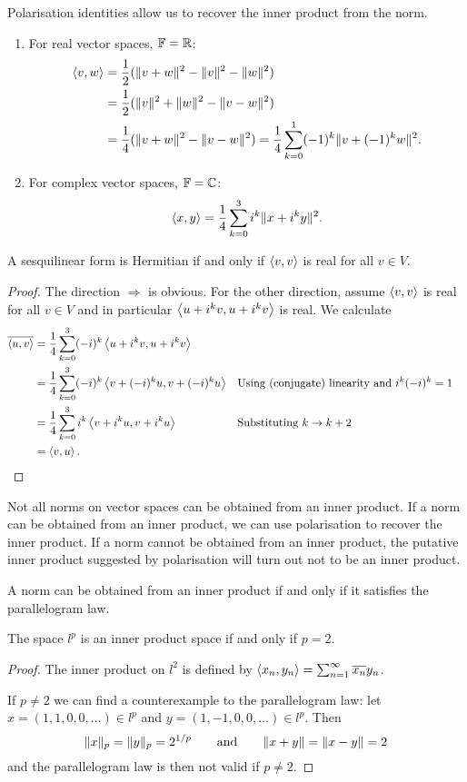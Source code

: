 \begin{theorem}
Polarisation identities allow us to recover the inner product from the norm.
\begin{enumerate}
\item For real vector spaces, $\mathbb{F} = \mathbb{R}$:
\begin{align*}
\left\langle v,w \right\rangle &= \frac{1}{2}(\lVert v+w\rVert^2 - \lVert v\rVert^2-\lVert w\rVert^2) \\
&= \frac{1}{2}(\lVert v\rVert^2 + \lVert w\rVert^2-\lVert v-w\rVert^2) \\
&= \frac{1}{4}(\lVert v+w\rVert^2 - \lVert v-w\rVert^2) = \frac{1}{4}\sum_{k=0}^1 (-1)^k\lVert v+(-1)^k w\rVert^2.
\end{align*}
\item For complex vector spaces, $\mathbb{F} = \mathbb{C}$:
\[ \left\langle x,y \right\rangle = \frac{1}{4}\sum_{k=0}^3 i^k\lVert x+i^k y\rVert^2. \]
\end{enumerate}
\end{theorem}
\begin{corollary}
A sesquilinear form is Hermitian \textup{if and only if} $\left\langle v,v \right\rangle$ is real for all $v\in V$.
\end{corollary}
\begin{proof}
The direction $\Rightarrow$ is obvious. For the other direction, assume $\left\langle v,v \right\rangle$ is real for all $v\in V$ and in particular $\left\langle u+i^kv,u+i^kv \right\rangle$ is real. We calculate
\begin{align*}
\overline{\left\langle u,v \right\rangle} &= \frac{1}{4}\sum^3_{k=0}(-i)^k\left\langle u+i^kv,u+i^kv \right\rangle \\
&= \frac{1}{4}\sum^3_{k=0}(-i)^k\left\langle v+(-i)^ku,v+(-i)^ku \right\rangle & &\text{Using (conjugate) linearity and $i^k(-i)^k=1$}\\
&= \frac{1}{4}\sum^3_{k=0}i^k\left\langle v+i^ku,v+i^ku \right\rangle & &\text{Substituting $k\to k+2$}\\
&= \left\langle v,u \right\rangle.
\end{align*}
\end{proof}
Not all norms on vector spaces can be obtained from an inner product. If a norm can be obtained from an inner product, we can use polarisation to recover the inner product. If a norm cannot be obtained from an inner product, the putative inner product suggested by polarisation will turn out not to be an inner product.
\begin{proposition}
A norm can be obtained from an inner product \textup{if and only if} it satisfies the parallelogram law.
\end{proposition}
\begin{corollary}
The space $l^p$ is an inner product space \textup{if and only if} $p=2$.
\end{corollary}
\begin{proof}
The inner product on $l^2$ is defined by $\left\langle x_n, y_n \right\rangle = \sum_{n=1}^\infty \overline{x_n}y_n$.

If $p\neq 2$ we can find a counterexample to the parallelogram law: let $x=(1,1,0,0,\ldots)\in l^p$ and $y = (1,-1,0,0,\ldots)\in l^p$. Then
\[ \lVert x\rVert_p = \lVert y\rVert_p = 2^{1/p} \qquad \text{and} \qquad \lVert x+y\rVert = \lVert x-y\rVert = 2 \]
and the parallelogram law is then not valid if $p\neq 2$.
\end{proof}


